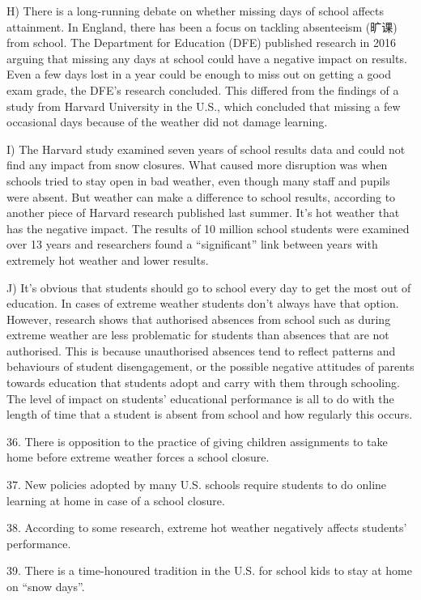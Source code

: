 \documentclass[UTF8,11pt]{ctexart}
\begin{document}
H) There is a long-running debate on whether missing days of school affects attainment. In England, there has been a focus on tackling absenteeism (旷课) from school. The Department for Education (DFE) published research in 2016 arguing that missing any days at school could have a negative impact on results. Even a few days lost in a year could be enough to miss out on getting a good exam grade, the DFE’s research concluded. This differed from the findings of a study from Harvard University in the U.S., which concluded that missing a few occasional days because of the weather did not damage learning.


I) The Harvard study examined seven years of school results data and could not find any impact from snow closures. What caused more disruption was when schools tried to stay open in bad weather, even though many staff and pupils were absent. But weather can make a difference to school results, according to another piece of Harvard research published last summer. It’s hot weather that has the negative impact. The results of 10 million school students were examined over 13 years and researchers found a “significant” link between years with extremely hot weather and lower results.


J) It’s obvious that students should go to school every day to get the most out of education. In cases of extreme weather students don’t always have that option. However, research shows that authorised absences from school such as during extreme weather are less problematic for students than absences that are not authorised. This is because unauthorised absences tend to reflect patterns and behaviours of student disengagement, or the possible negative attitudes of parents towards education that students adopt and carry with them through schooling. The level of impact on students’ educational performance is all to do with the length of time that a student is absent from school and how regularly this occurs.


36. There is opposition to the practice of giving children assignments to take home before extreme weather forces a school closure.


37. New policies adopted by many U.S. schools require students to do online learning at home in case of a school closure.


38. According to some research, extreme hot weather negatively affects students’ performance.


39. There is a time-honoured tradition in the U.S. for school kids to stay at home on “snow days”.
\end{document}
